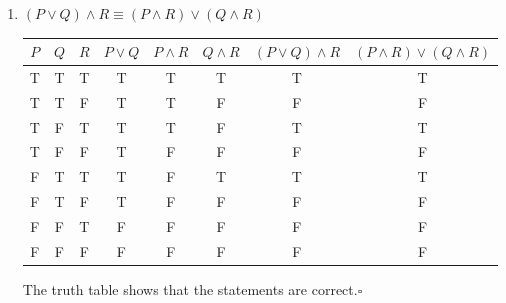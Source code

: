 \documentclass[11pt]{article}
\begin{document}
\begin{enumerate}
	\item $(P \lor Q) \land R \equiv (P \land R) \lor (Q \land R)$
	      \begin{center}
		      \begin{tabular}{|c|c|c|c|c|c|c|c|}
			      \hline
			      $P$ & $Q$ & $R$ & $P \lor Q$ & $P \land R$ & $Q \land R$ & $(P \lor Q) \land R$ & $(P \land R) \lor (Q \land R)$ \\
			      \hline
			      T   & T   & T   & T          & T           & T           & T                    & T                              \\
			      T   & T   & F   & T          & T           & F           & F                    & F                              \\
			      T   & F   & T   & T          & T           & F           & T                    & T                              \\
			      T   & F   & F   & T          & F           & F           & F                    & F                              \\
			      F   & T   & T   & T          & F           & T           & T                    & T                              \\
			      F   & T   & F   & T          & F           & F           & F                    & F                              \\
			      F   & F   & T   & F          & F           & F           & F                    & F                              \\
			      F   & F   & F   & F          & F           & F           & F                    & F                              \\
			      \hline
		      \end{tabular}
	      \end{center}
	      The truth table shows that the statements are correct.\qquad $\square$


\end{enumerate}
\end{document}
